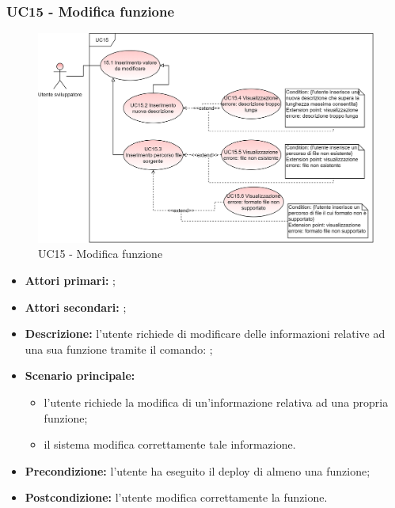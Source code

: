 \subsubsection{UC15 - Modifica funzione }
\begin{figure}[H]
	\centering
	\includegraphics[scale=\ucs]{./res/img/UC15.png}
	\caption {UC15 - Modifica funzione }
\end{figure}
\begin{itemize}
	\item \textbf{Attori primari:} \us{};
	\item \textbf{Attori secondari:} \re{};
	\item \textbf{Descrizione:} l’utente richiede di modificare delle informazioni relative ad una sua funzione tramite il comando: \pedit{};
	\item \textbf{Scenario principale:} 
	\begin{itemize}
		\item l’utente richiede la modifica di un’informazione relativa ad una propria funzione;
		\item il sistema modifica correttamente tale informazione.  
	\end{itemize}
	\item \textbf{Precondizione:} l’utente ha eseguito il deploy di almeno una funzione;
	\item \textbf{Postcondizione:} l’utente modifica correttamente la funzione. 
\end{itemize}